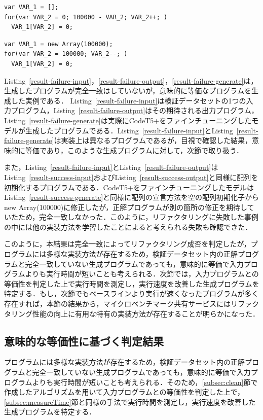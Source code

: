 \documentclass[submit,techrep,noauthor]{ipsj}
\begin{document}
\begin{lstlisting}[caption=Result Failure (Output), label=result-failure-output,captionpos=t]
var VAR_1 = [];
for(var VAR_2 = 0; 100000 - VAR_2; VAR_2++; )
  VAR_1[VAR_2] = 0;
\end{lstlisting}

\begin{lstlisting}[caption=Result Failure (Generate), label=result-failure-generate,captionpos=t]
var VAR_1 = new Array(100000);
for(var VAR_2 = 100000; VAR_2--; )
  VAR_1[VAR_2] = 0;
\end{lstlisting}

Listing~\ref{result-failure-input}，\ref{result-failure-output}，\ref{result-failure-generate}は，生成したプログラムが完全一致はしていないが，意味的に等価なプログラムを生成した実例である．
Listing~\ref{result-failure-input}は検証データセットの1つの入力プログラム，Listing~\ref{result-failure-output}はその期待される出力プログラム，Listing~\ref{result-failure-generate}は実際にCodeT5+をファインチューニングしたモデルが生成したプログラムである．Listing~\ref{result-failure-input}とListing~\ref{result-failure-generate}は実装上は異なるプログラムであるが，目視で確認した結果，意味的に等価であり，このような生成プログラムに対して，次節で取り扱う．

また，Listing~\ref{result-failure-input}とListing~\ref{result-failure-output}はListing~\ref{result-success-input}およびListing~\ref{result-success-output}と同様に配列を初期化するプログラムである．CodeT5+をファインチューニングしたモデルはListing~\ref{result-success-generate}と同様に配列の宣言方法を空の配列初期化子からnew Array(100000)に修正したが，正解プログラムが別の箇所の修正を期待していたため，完全一致しなかった．このように，リファクタリングに失敗した事例の中には他の実装方法を学習したことによると考えられる失敗も確認できた．

このように，本結果は完全一致によってリファクタリング成否を判定したが，プログラムには多様な実装方法が存在するため，検証データセット内の正解プログラムと完全一致していない生成プログラムであっても，意味的に等価で入力プログラムよりも実行時間が短いことも考えられる．次節では，入力プログラムとの等価性を判定した上で実行時間を測定し，実行速度を改善した生成プログラムを特定する．もし，次節でもベースラインより実行が速くなったプログラムが多く存在すれば，本節の結果から，マイクロベンチマーク共有サービスにはリファクタリング性能の向上に有用な特有の実装方法が存在することが明らかになった．

\subsection{意味的な等価性に基づく判定結果}
プログラムには多様な実装方法が存在するため，検証データセット内の正解プログラムと完全一致していない生成プログラムであっても，意味的に等価で入力プログラムよりも実行時間が短いことも考えられる．そのため，\ref{subsec:clean}節で作成したアルゴリズムを用いて入力プログラムとの等価性を判定した上で，\ref{subsec:measureTime}節と同様の手法で実行時間を測定し，実行速度を改善した生成プログラムを特定する．
\end{document}
